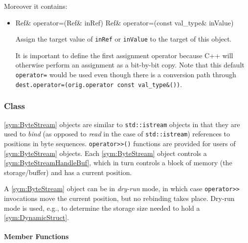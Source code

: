 Moreover it contains:
\begin{itemize}
	\item
		\begin{cppsnippet}
		Ref& operator=(Ref& inRef)
		Ref& operator=(const val_type& inValue)
		\end{cppsnippet}
		
		Assign the target value of \texttt{inRef} or \texttt{inValue} to the target of this object.
		
		It is important to define the first assignment operator because C++ will otherwise perform an assignment as a bit-by-bit copy. Note that this default \texttt{operator=} would be used even though there is a conversion path through \texttt{dest.operator=(orig.operator const val\_type\&())}.
\end{itemize}


\subsubsection[Class ByteStream]{Class }

\ref{sym:ByteStream} objects are similar to \texttt{std::istream} objects in that they are used to \emph{bind} (as opposed to \emph{read} in the case of \texttt{std::istream}) references to positions in byte sequences. \texttt{operator>\/>()} functions are provided for users of \ref{sym:ByteStream} objects. Each \ref{sym:ByteStream} object controls a \ref{sym:ByteStreamHandleBuf}, which in turn controls a block of memory (the storage/buffer) and has a current position.

A \ref{sym:ByteStream} object can be in \emph{dry-run} mode, in which case \texttt{operator>\/>} invocations move the current position, but no rebinding takes place. Dry-run mode is used, e.g., to determine the storage size needed to hold a \ref{sym:DynamicStruct}.

\paragraph{Member Functions}


